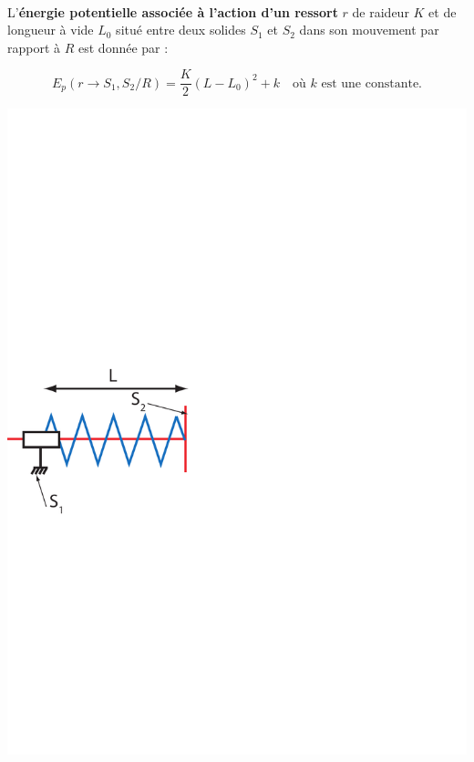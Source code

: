 \documentclass[10pt,fleqn]{article} %
\begin{document}
\begin{defi}
~\\

\begin{minipage}[c]{.65\linewidth}
L'\textbf{énergie potentielle associée à l'action d'un ressort} $r$ de raideur $K$ et de longueur à vide $L_0$ situé entre deux solides $S_1$ et $S_2$ dans son mouvement par rapport à $R$ est donnée par :

$$
E_p(r \rightarrow S_1,S_2/R)=\frac{K}{2}(L-L_0)^2+k \quad \text{où }k\text{ est une constante}.
$$
\end{minipage} 
\hfill
\begin{minipage}[c]{.3\linewidth}
\begin{center}
\includegraphics[width=\linewidth]{images/ressort.pdf}
\end{center}
\end{minipage}
\end{defi}
\end{document}

